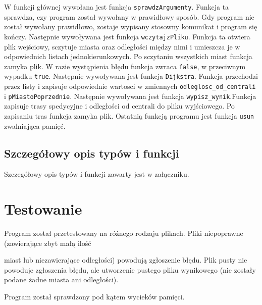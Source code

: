 \documentclass[12pt,a4paper,twoside]{article}
\newcommand{\ksremark}[1]{%
   {{\color{brickred}{[#1]}}}%
   \addcontentsline{rks}{uwagas}{\protect{#1}}%
}
\begin{document}
W funkcji głównej wywołana jest funkcja \lstinline|sprawdzArgumenty|.
Funkcja ta sprawdza, czy program został wywołany w prawidłowy sposób. Gdy program nie został wywołany prawidłowo, zostaje wypisany stosowny komunikat i program się kończy.
Następnie wywoływana jest funkcja \lstinline|wczytajzPliku|.
Funkcja ta otwiera plik wejściowy, sczytuje miasta oraz odległości między nimi i umieszcza je w odpowiednich listach jednokierunkowych.
Po sczytaniu wszystkich miast funkcja zamyka plik.
W razie wystąpienia błędu funkcja zwraca \lstinline!false!, w przeciwnym wypadku \lstinline!true!.
Następnie wywoływana jest funkcja \lstinline|Dijkstra|.
Funkcja przechodzi przez listy i zapisuje odpowiednie wartosci w zmiennych \lstinline!odleglosc_od_centrali! i \lstinline!pMiastoPoprzednie!.
Następnie wywoływana jest funkcja \lstinline|wypisz_wynik|.Funkcja zapisuje trasy spedycyjne i odległości od centrali do pliku wyjściowego. Po zapisaniu tras funkcja zamyka plik.
Ostatnią funkcją programu jest funkcja \lstinline|usun| zwalniająca pamięć.


\subsection{Szczegółowy opis typów i funkcji}

Szczegółowy opis typów i funkcji zawarty jest w załączniku.

 

\section{Testowanie}

Program został przetestowany na różnego rodzaju plikach. Pliki niepoprawne (zawierające zbyt małą ilość \ksremark{liczba} miast lub niezawierające odległości) powodują zgłoszenie błędu. Plik pusty nie powoduje zgłoszenia błędu, ale utworzenie pustego pliku wynikowego (nie zostały podane żadne miasta ani odległości). 

Program został sprawdzony pod kątem wycieków pamięci.

%
\end{document}
